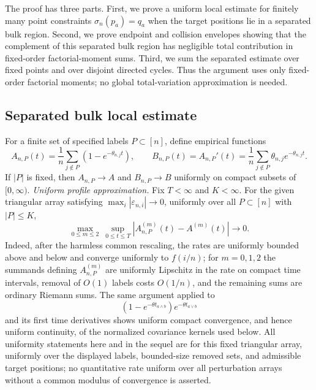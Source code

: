 \documentclass[11pt]{article}
\theoremstyle{remark}
\newcommand{\eps}{\varepsilon}
\begin{document}
The proof has three parts.  First, we prove a uniform local estimate for finitely many point constraints \(\sigma_n(p_a)=q_a\) when the target positions lie in a separated bulk region.  Second, we prove endpoint and collision envelopes showing that the complement of this separated bulk region has negligible total contribution in fixed-order factorial-moment sums.  Third, we sum the separated estimate over fixed points and over disjoint directed cycles.  Thus the argument uses only fixed-order factorial moments; no global total-variation approximation is needed.

\subsection{Separated bulk local estimate}

For a finite set of specified labels \(P\subset[n]\), define empirical functions
\[
        A_{n,P}(t)=\frac1n\sum_{j\notin P}(1-e^{-\theta_{n,j}t}),
        \qquad
        B_{n,P}(t)=A_{n,P}'(t)=\frac1n\sum_{j\notin P}\theta_{n,j}e^{-\theta_{n,j}t}.
\]
If \(|P|\) is fixed, then \(A_{n,P}\to A\) and \(B_{n,P}\to B\) uniformly on compact subsets of \([0,\infty)\).
\medskip
\noindent\textit{Uniform profile approximation.}
Fix \(T<\infty\) and \(K<\infty\).  For the given triangular array satisfying
\(\max_i|\eps_{n,i}|\to0\), uniformly over all \(P\subset[n]\) with
\(|P|\le K\),
\[
 \max_{0\le m\le2}\ \sup_{0\le t\le T}
 \left|A_{n,P}^{(m)}(t)-A^{(m)}(t)\right|\longrightarrow0.
\]
Indeed, after the harmless common rescaling, the rates are uniformly bounded
above and below and converge uniformly to \(f(i/n)\); for \(m=0,1,2\) the
summands defining \(A_{n,P}^{(m)}\) are uniformly Lipschitz in the rate on
compact time intervals, removal of \(O(1)\) labels costs \(O(1/n)\), and the
remaining sums are ordinary Riemann sums.  The same argument applied to
\[
 (1-e^{-\theta t_{a\wedge b}})e^{-\theta t_{a\vee b}}
\]
and its first time derivatives shows uniform compact convergence, and hence
uniform continuity, of the normalized covariance kernels used below.  All
uniformity statements here and in the sequel are for this fixed triangular
array, uniformly over the displayed labels, bounded-size removed sets, and
admissible target positions; no quantitative rate uniform over all
perturbation arrays without a common modulus of convergence is asserted.
\end{document}
